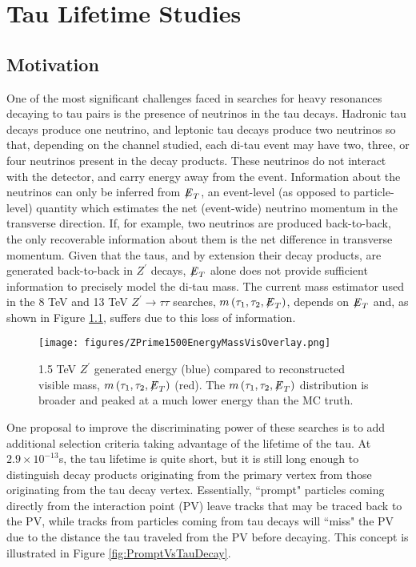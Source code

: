 \chapter{Tau Lifetime Studies}

\section{Motivation}

One of the most significant challenges faced in searches for heavy resonances decaying to tau pairs is the presence of neutrinos in the tau decays. Hadronic tau decays produce one neutrino, and leptonic tau decays produce two neutrinos so that, depending on the channel studied, each di-tau event may have two, three, or four neutrinos present in the decay products. These neutrinos do not interact with the detector, and carry energy away from the event. Information about the neutrinos can only be inferred from ${\not\mathrel{E}}_T$, an event-level (as opposed to particle-level) quantity which estimates the net (event-wide) neutrino momentum in the transverse direction. If, for example, two neutrinos are produced back-to-back, the only recoverable information about them is the net difference in transverse momentum. Given that the taus, and by extension their decay products, are generated back-to-back in $Z^\prime$ decays, ${\not\mathrel{E}}_T$ alone does not provide sufficient information to precisely model the di-tau mass. The current mass estimator used in the 8 TeV and 13 TeV $Z^\prime\to\tau\tau$ searches, $m\left(\tau_1, \tau_2, {\not\mathrel{E}}_T\right)$, depends on ${\not\mathrel{E}}_T$ and, as shown in Figure \ref{fig:massVisSigVsMC}, suffers due to this loss of information.

\begin{figure}[tbh!]
\centering
\texttt{[image: figures/ZPrime1500EnergyMassVisOverlay.png]}
\caption{1.5 TeV $Z^\prime$ generated energy (blue) compared to reconstructed visible mass, $m\left(\tau_1, \tau_2, {\not\mathrel{E}}_T\right)$ (red). The $m\left(\tau_1, \tau_2, {\not\mathrel{E}}_T\right)$ distribution is broader and peaked at a much lower energy than the MC truth.}
\label{fig:massVisSigVsMC}
\end{figure}

One proposal to improve the discriminating power of these searches is to add additional selection criteria taking advantage of the lifetime of the tau. At $2.9\times 10^{-13}$s, the tau lifetime is quite short, but it is still long enough to distinguish decay products originating from the primary vertex from those originating from the tau decay vertex. Essentially, ``prompt" particles coming directly from the interaction point (PV) leave tracks that may be traced back to the PV, while tracks from particles coming from tau decays will ``miss" the PV due to the distance the tau traveled from the PV before decaying. This concept is illustrated in Figure \ref{fig:PromptVsTauDecay}.

